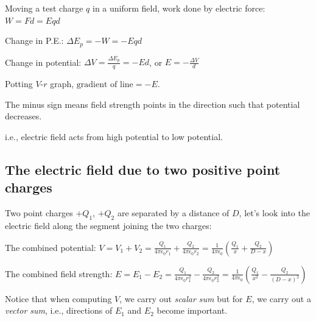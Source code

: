 Moving a test charge $q$ in a uniform field, work done by electric force: $W=Fd = Eqd$
		
Change in P.E.: $\Delta E_p = -W = -Eqd$

Change in potential: $\Delta V = \frac{\Delta E_p}{q} = - Ed$, or $E=-\frac{\Delta V}{d}$

Potting $V$-$r$ graph, $\text{gradient of line}=-E$.

The minus sign means field strength points in the direction such that potential decreases.

i.e., electric field acts from high potential to low potential.



\subsection*{The electric field due to two positive point charges}

Two point charges $+Q_1$, $+Q_2$ are separated by a distance of $D$, let's look into the electric field along the segment joining the two charges:

\begin{center}
\end{center}

The combined potential: $V = V_1 + V_2 = \frac{Q_1}{4\pi\epsilon_0r_1} + \frac{Q_2}{4\pi\epsilon_0r_2} = \frac{1}{4\pi\epsilon_0}\left(\frac{Q_1}{x} + \frac{Q_2}{D-x}\right)$

The combined field strength: $E = E_1 - E_2 = \frac{Q_1}{4\pi\epsilon_0r_1^2} - \frac{Q_2}{4\pi\epsilon_0r_2^2} = \frac{1}{4\pi\epsilon_0}\left(\frac{Q_1}{x^2} - \frac{Q_2}{(D-x)^2}\right)$

Notice that when computing $V$, we carry out \emph{scalar sum} but for $E$, we carry out a \emph{vector sum}, i.e., directions of $E_1$ and $E_2$ become important.


